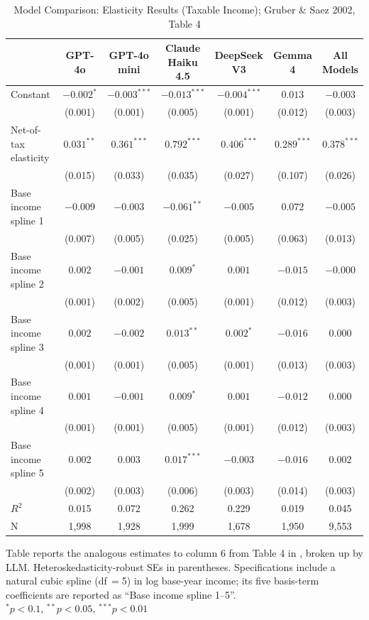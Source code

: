 \begin{table}[!htbp] \centering
  \caption{Model Comparison: Elasticity Results (Taxable Income); Gruber \& Saez 2002, Table 4}
  \label{tab:obs_regs_taxable}
  \begin{tabular}{lcccccc}
  \toprule
  & GPT-4o & \shortstack{GPT-4o \\ mini} & \shortstack{Claude \\ Haiku 4.5} & \shortstack{DeepSeek \\ V3} & Gemma 4 & \shortstack{All \\ Models} \\
  \midrule
  Constant & $-0.002^{*}$ & $-0.003^{***}$ & $-0.013^{***}$ & $-0.004^{***}$ & $0.013$ & $-0.003$ \\
  & (0.001) & (0.001) & (0.005) & (0.001) & (0.012) & (0.003) \\
  Net-of-tax elasticity & $0.031^{**}$ & $0.361^{***}$ & $0.792^{***}$ & $0.406^{***}$ & $0.289^{***}$ & $0.378^{***}$ \\
  & (0.015) & (0.033) & (0.035) & (0.027) & (0.107) & (0.026) \\
  Base income spline 1 & $-0.009$ & $-0.003$ & $-0.061^{**}$ & $-0.005$ & $0.072$ & $-0.005$ \\
  & (0.007) & (0.005) & (0.025) & (0.005) & (0.063) & (0.013) \\
  Base income spline 2 & $0.002$ & $-0.001$ & $0.009^{*}$ & $0.001$ & $-0.015$ & $-0.000$ \\
  & (0.001) & (0.002) & (0.005) & (0.001) & (0.012) & (0.003) \\
  Base income spline 3 & $0.002$ & $-0.002$ & $0.013^{**}$ & $0.002^{*}$ & $-0.016$ & $0.000$ \\
  & (0.001) & (0.001) & (0.005) & (0.001) & (0.013) & (0.003) \\
  Base income spline 4 & $0.001$ & $-0.001$ & $0.009^{*}$ & $0.001$ & $-0.012$ & $0.000$ \\
  & (0.001) & (0.001) & (0.005) & (0.001) & (0.012) & (0.003) \\
  Base income spline 5 & $0.002$ & $0.003$ & $0.017^{***}$ & $-0.003$ & $-0.016$ & $0.002$ \\
  & (0.002) & (0.003) & (0.006) & (0.003) & (0.014) & (0.003) \\
  \midrule
  $R^2$ & 0.015 & 0.072 & 0.262 & 0.229 & 0.019 & 0.045 \\
  \midrule
  N & 1,998 & 1,928 & 1,999 & 1,678 & 1,950 & 9,553 \\
  \bottomrule
  \end{tabular}
  \begin{flushleft}\footnotesize
  Table reports the analogous estimates to column 6 from Table 4 in \cite{GruberSaez2002}, broken up by LLM. Heteroskedasticity-robust SEs in parentheses. Specifications include a natural cubic spline (df\,$=$5) in log base-year income; its five basis-term coefficients are reported as ``Base income spline 1--5''.\\
  $^{*}p<0.1$, $^{**}p<0.05$, $^{***}p<0.01$
  \end{flushleft}
\end{table}